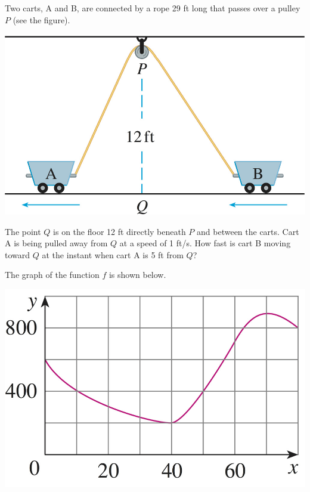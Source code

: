 \documentclass[12pt, addpoints]{exam/exam}
\newcommand{\1}{^{-1}}
\theoremstyle{plain}
\begin{document}
\begin{questions}
\thispagestyle{headandfoot}

\question[15] %
Two carts, A and B, are connected by a rope %
29 
 ft long that passes over a pulley $P$ (see the figure).
\vspace{-0.9pc}
\begin{center}
	\includegraphics[scale=4.1]{3-9_42Stewart8Ed.jpg}
\end{center}
\vspace{-0.9pc}

The point $Q$ is on the floor 12 ft directly beneath $P$ and between the carts.  Cart A is being pulled away from $Q$ at a speed of %
1  
ft/s.  How fast is cart B moving toward $Q$ at the instant when cart A is 5 ft from $Q$?

\vfill

\newpage
\question %
The graph of the function $f$ is shown below.
\begin{center}
\includegraphics[scale=4.5]{2-7_18Stewart8Ed}
\end{center}
	\begin{parts}

\end{parts}
\end{questions}
\end{document}
